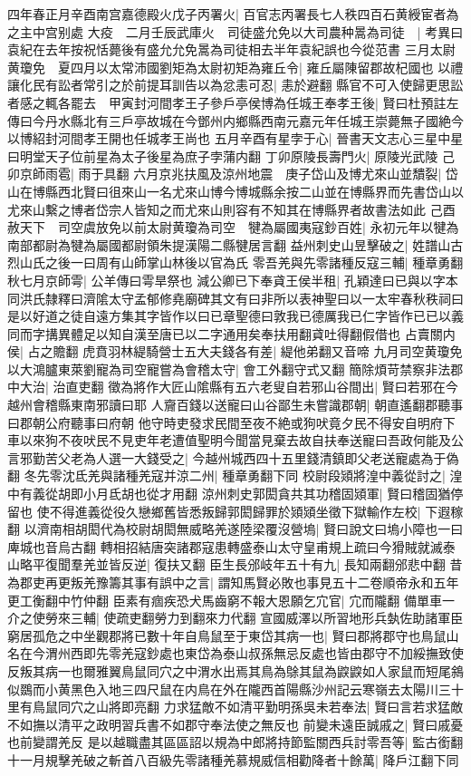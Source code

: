 四年春正月辛酉南宫嘉德殿火戊子丙署火|{
	百官志丙署長七人秩四百石黄綬宦者為之主中宫别處}
大疫　二月壬辰武庫火　司徒盛允免以大司農种暠為司徒　|{
	考異曰袁紀在去年按祝恬薨後有盛允允免暠為司徒相去半年袁紀誤也今從范書}
三月太尉黄瓊免　夏四月以太常沛國劉矩為太尉初矩為雍丘令|{
	雍丘屬陳留郡故杞國也}
以禮讓化民有訟者常引之於前提耳訓告以為忿恚可忍|{
	恚於避翻}
縣官不可入使歸更思訟者感之輒各罷去　甲寅封河間孝王子參戶亭侯博為任城王奉孝王後|{
	賢曰杜預註左傳曰今丹水縣北有三戶亭故城在今鄧州内鄉縣西南元嘉元年任城王崇薨無子國絶今以博紹封河間孝王開也任城孝王尚也}
五月辛酉有星孛于心|{
	晉書天文志心三星中星曰明堂天子位前星為太子後星為庶子孛蒲内翻}
丁卯原陵長壽門火|{
	原陵光武陵}
己卯京師雨雹|{
	雨于具翻}
六月京兆扶風及涼州地震　庚子岱山及博尤來山並穨裂|{
	岱山在博縣西北賢曰徂來山一名尤來山博今博城縣余按二山並在博縣界而先書岱山以尤來山繫之博者岱宗人皆知之而尤來山則容有不知其在博縣界者故書法如此}
己酉赦天下　司空虞放免以前太尉黄瓊為司空　犍為屬國夷寇鈔百姓|{
	永初元年以犍為南部都尉為犍為屬國都尉領朱提漢陽二縣犍居言翻}
益州刺史山昱擊破之|{
	姓譜山古烈山氏之後一曰周有山師掌山林後以官為氏}
零吾羌與先零諸種反寇三輔|{
	種章勇翻}
秋七月京師雩|{
	公羊傳曰雩旱祭也}
減公卿已下奉貣王侯半租|{
	孔穎達曰已與以字本同洪氏隸釋曰濟隂太守孟郁修堯廟碑其文有曰非所以表神聖曰以一太牢春秋秩祠曰是以好道之徒自遠方集其字皆作以曰已章聖德曰敦我已德厲我已仁字皆作已已以義同而字搆異體足以知自漢至唐已以二字通用矣奉扶用翻貣吐得翻假借也}
占賣關内侯|{
	占之贍翻}
虎賁羽林緹騎營士五大夫錢各有差|{
	緹他弟翻又音啼}
九月司空黄瓊免以大鴻臚東萊劉寵為司空寵嘗為會稽太守|{
	會工外翻守式又翻}
簡除煩苛禁察非法郡中大治|{
	治直吏翻}
徵為將作大匠山隂縣有五六老叟自若邪山谷間出|{
	賢曰若邪在今越州會稽縣東南邪讀曰耶}
人齎百錢以送寵曰山谷鄙生未嘗識郡朝|{
	朝直遙翻郡聽事曰郡朝公府聽事曰府朝}
他守時吏發求民間至夜不絶或狗吠竟夕民不得安自明府下車以來狗不夜吠民不見吏年老遭值聖明今聞當見棄去故自扶奉送寵曰吾政何能及公言邪勤苦父老為人選一大錢受之|{
	今越州城西四十五里錢清鎮即父老送寵處為于偽翻}
冬先零沈氐羌與諸種羌寇并涼二州|{
	種章勇翻下同}
校尉段熲將湟中義從討之|{
	湟中有義從胡即小月氐胡也從才用翻}
涼州刺史郭閎貪共其功稽固熲軍|{
	賢曰稽固猶停留也}
使不得進義從役久戀鄉舊皆悉叛歸郭閎歸罪於熲熲坐徵下獄輸作左校|{
	下遐稼翻}
以濟南相胡閎代為校尉胡閎無威略羌遂陸梁覆沒營塢|{
	賢曰說文曰塢小障也一曰庳城也音烏古翻}
轉相招結唐突諸郡寇患轉盛泰山太守皇甫規上疏曰今猾賊就滅泰山略平復聞羣羌並皆反逆|{
	復扶又翻}
臣生長邠岐年五十有九|{
	長知兩翻邠悲中翻}
昔為郡吏再更叛羌豫籌其事有誤中之言|{
	謂知馬賢必敗也事見五十二卷順帝永和五年更工衡翻中竹仲翻}
臣素有痼疾恐犬馬齒窮不報大恩願乞宂官|{
	宂而隴翻}
備單車一介之使勞來三輔|{
	使疏吏翻勞力到翻來力代翻}
宣國威澤以所習地形兵埶佐助諸軍臣窮居孤危之中坐觀郡將已數十年自鳥鼠至于東岱其病一也|{
	賢曰郡將郡守也鳥鼠山名在今渭州西即先零羌寇鈔處也東岱為泰山叔孫無忌反處也皆由郡守不加綏撫致使反叛其病一也爾雅翼鳥鼠同穴之中渭水出焉其鳥為鵌其鼠為鼵鼵如人家鼠而短尾䳜似鵽而小黄黑色入地三四尺鼠在内鳥在外在隴西首陽縣沙州記云寒嶺去太陽川三十里有鳥鼠同穴之山將即亮翻}
力求猛敵不如清平勤明孫吳未若奉法|{
	賢曰言若求猛敵不如撫以清平之政明習兵書不如郡守奉法使之無反也}
前變未遠臣誠戚之|{
	賢曰戚憂也前變謂羌反}
是以越職盡其區區詔以規為中郎將持節監關西兵討零吾等|{
	監古銜翻}
十一月規擊羌破之斬首八百級先零諸種羌慕規威信相勸降者十餘萬|{
	降戶江翻下同}


